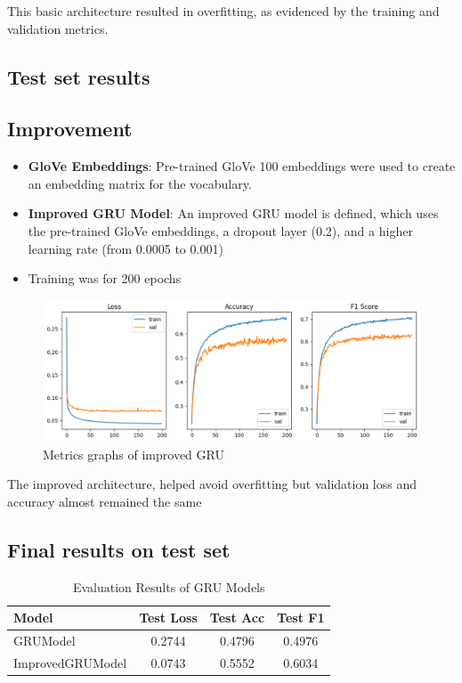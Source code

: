 \documentclass[12pt, a4paper]{article}
\begin{document}
This basic architecture resulted in overfitting, as evidenced by the training and validation metrics.

\subsection{Test set results}



\subsection{Improvement}

\begin{itemize}
    \item \textbf{GloVe Embeddings}: Pre-trained GloVe 100 embeddings were used to create an embedding matrix for the vocabulary.
    \item \textbf{Improved GRU Model}: An improved GRU model is defined, which uses the pre-trained GloVe embeddings, a dropout layer (0.2), and a higher learning rate (from 0.0005 to 0.001)
    \item Training was for 200 epochs
\end{itemize}

\begin{figure}
    \centering
    \includegraphics[width=0.5\linewidth]{improved_graphs.png}
    \caption{Metrics graphs of improved GRU}
    \label{fig:enter-label}
\end{figure}

The improved architecture, helped avoid overfitting but validation loss and accuracy almost remained the same

\subsection{Final results on test set}

\begin{table}[h]
\centering
\begin{tabular}{|l|c|c|c|}
\hline
\textbf{Model} & \textbf{Test Loss} & \textbf{Test Acc} & \textbf{Test F1} \\
\hline
GRUModel & 0.2744 & 0.4796 & 0.4976 \\
ImprovedGRUModel & 0.0743 & 0.5552 & 0.6034 \\
\hline
\end{tabular}
\caption{Evaluation Results of GRU Models}
\label{tab:gru_results}
\end{table}
\end{document}
